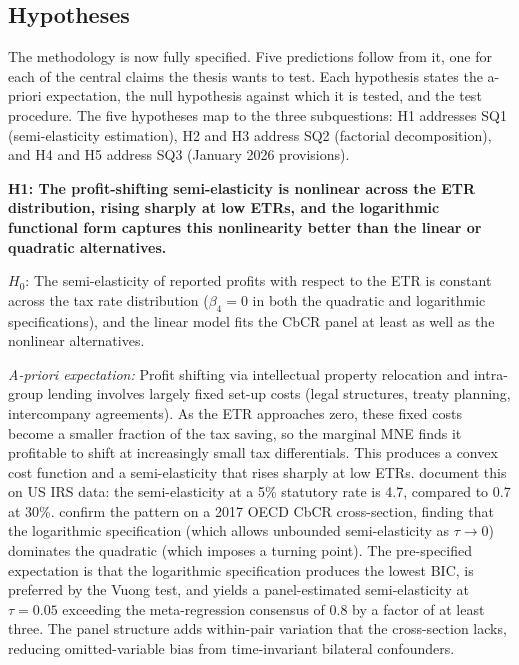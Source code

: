 \documentclass[11pt,a4paper]{article}
\begin{document}
\subsection{Hypotheses}\label{sec:hypotheses}

The methodology is now fully specified. Five predictions follow from it, one for each of the central claims the thesis wants to test. Each hypothesis states the a-priori expectation, the null hypothesis against which it is tested, and the test procedure. The five hypotheses map to the three subquestions: H1 addresses SQ1 (semi-elasticity estimation), H2 and H3 address SQ2 (factorial decomposition), and H4 and H5 address SQ3 (January 2026 provisions).

\textbf{H1: The profit-shifting semi-elasticity is nonlinear across the ETR distribution, rising sharply at low ETRs, and the logarithmic functional form captures this nonlinearity better than the linear or quadratic alternatives.}

$H_0$: The semi-elasticity of reported profits with respect to the ETR is constant across the tax rate distribution ($\beta_4 = 0$ in both the quadratic and logarithmic specifications), and the linear model fits the CbCR panel at least as well as the nonlinear alternatives.

\textit{A-priori expectation:} Profit shifting via intellectual property relocation and intra-group lending involves largely fixed set-up costs (legal structures, treaty planning, intercompany agreements). As the ETR approaches zero, these fixed costs become a smaller fraction of the tax saving, so the marginal MNE finds it profitable to shift at increasingly small tax differentials. This produces a convex cost function and a semi-elasticity that rises sharply at low ETRs. \citet{dowd2017} document this on US IRS data: the semi-elasticity at a 5\% statutory rate is 4.7, compared to 0.7 at 30\%. \citet{garcia-bernardo2024} confirm the pattern on a 2017 OECD CbCR cross-section, finding that the logarithmic specification (which allows unbounded semi-elasticity as $\tau \to 0$) dominates the quadratic (which imposes a turning point). The pre-specified expectation is that the logarithmic specification produces the lowest BIC, is preferred by the Vuong test, and yields a panel-estimated semi-elasticity at $\tau = 0.05$ exceeding the meta-regression consensus of 0.8 \citep{heckemeyer2017} by a factor of at least three. The panel structure adds within-pair variation that the cross-section lacks, reducing omitted-variable bias from time-invariant bilateral confounders.
\end{document}
